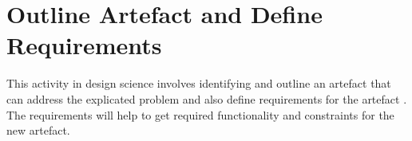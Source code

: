 \chapter{Outline Artefact and Define Requirements}
This activity in design science involves identifying and outline an artefact that can address the explicated problem and also define requirements for the artefact \cite{johannesson2012design}. The requirements will help to get required functionality and constraints for the new artefact. 





